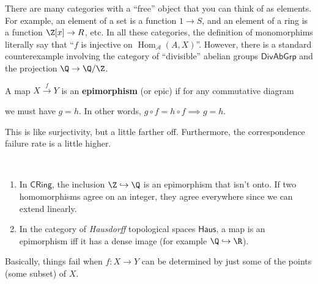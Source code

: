 There are many categories with a ``free'' object that you can think of as elements. For example, an element of a set is a function $1 \to S$, and an element of a ring is a function $\Z[x]\to R$, etc. In all these categories, the definition of monomorphims literally say that ``$f$ is injective on $\operatorname{Hom}_{\mathcal{A} }(A,X)$''. However, there is a standard counterexample involving the category of ``divisible'' abelian groups $\mathsf{DivAbGrp} $ and the projection $\Q\to \Q /\Z$.
\begin{definition}[Epimorphisms]
    A map $X \overset{f}{\to } Y$ is an \textbf{epimorphism} (or epic) if for any commutative diagram 
    \begin{figure}[H]
    \centering
    \end{figure}
    we must have $g=h$. In other words, $g\circ f=h\circ f\implies g=h$. \end{definition}
This is like surjectivity, but a little farther off. Furthermore, the correspondence failure rate is a little higher.
\begin{example}
    \,
    \begin{enumerate}[label=(\alph*)]
        \item In $\mathsf{CRing} $, the inclusion $\Z\hookrightarrow \Q$ is an epimorphism that isn't onto. If two homomorphisms agree on an integer, they agree everywhere since we can extend linearly.
        \item In the category of \emph{Hausdorff} topological spaces $\mathsf{Haus} $, a map is an epimorphism iff it has a dense image (for example $\Q\hookrightarrow \R$). 
    \end{enumerate}
    Basically, things fail when $f \colon X \to Y$ can be determined by just some of the points (some subset) of $X$.
\end{example}


